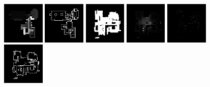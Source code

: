 \begin{figure}[h!]
\begin{minipage}[b]{\linewidth}
	\begin{center}
		\includegraphics[width=2cm]{figures/results/samples/cond/sample21_map_heightmap_true.png}
		\includegraphics[width=2cm]{figures/results/samples/cond/sample21_map_wallmap_true.png}
		\hfill 
		\includegraphics[width=2cm]{figures/results/samples/cond/sample21_map_floormap_generated.png}
		\includegraphics[width=2cm]{figures/results/samples/cond/sample21_map_heightmap_generated.png}
		\includegraphics[width=2cm]{figures/results/samples/cond/sample21_map_thingsmap_generated.png}
		\includegraphics[width=2cm]{figures/results/samples/cond/sample21_map_wallmap_generated.png}
	\end{center}
	

\end{minipage}
\end{figure}
